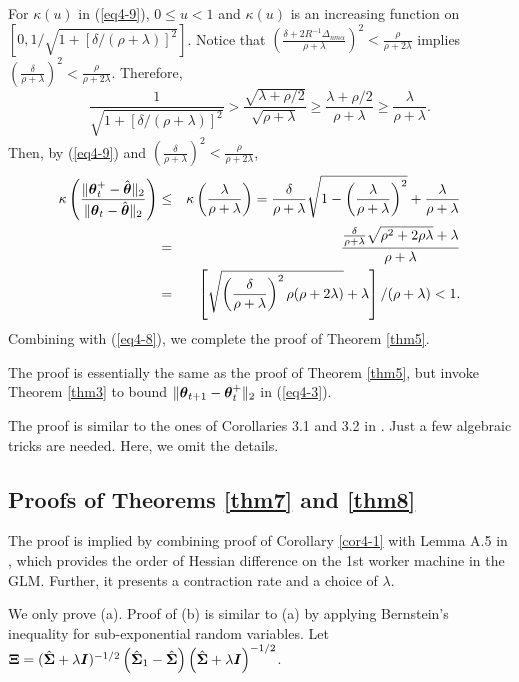 \documentclass[12pt,a4paper]{article}%
\newcommand\bes{\begin{eqnarray}}
\newcommand\ees{\end{eqnarray}}
\newcommand \vc[1]{{\mbox{\boldmath${#1}$}}}
\newcommand \vtheta{\vc \theta}
\numberwithin{equation}{section}
\newcommand{\sbr}[1]{\left(#1\right)}        %
\newcommand{\mbr}[1]{\left[#1\right]}        %
\begin{document}
For $\kappa(u)$ in (\ref{eq4-9}), $0\leq u<1$ and $\kappa(u)$ is an increasing function on $[0, 1/\sqrt{1+[\delta/(\rho+\lambda)]^2}]$.
Notice that $\sbr{\frac{\delta+2R^{-1}\Delta_{nm\alpha}}{\rho+\lambda}}^2<\frac{\rho}{\rho+2\lambda}$ implies $\sbr{\frac{\delta}{\rho+\lambda}}^2<\frac{\rho}{\rho+2\lambda}$. Therefore,
$$\frac{1}{\sqrt{1+[\delta/(\rho+\lambda)]^2}}>\frac{\sqrt{\lambda+\rho/2}}{\sqrt{\rho+\lambda}}\geq \frac{\lambda+\rho/2}{\rho+\lambda}\geq \frac{\lambda}{\rho+\lambda}.$$
Then, by (\ref{eq4-9}) and $\sbr{\frac{\delta}{\rho+\lambda}}^2<\frac{\rho}{\rho+2\lambda}$,
\bes
\kappa\sbr{\frac{\|\vtheta_t^+-\hat{\vtheta}\|_2}{\|\vtheta_t-\hat{\vtheta}\|_2}}&\leq&\kappa\sbr{\frac{\lambda}{\rho+\lambda}}
=\frac{\delta}{\rho+\lambda}\sqrt{1-\sbr{\frac{\lambda}{\rho+\lambda}}^2}+\frac{\lambda}{\rho+\lambda}\nonumber\\
&=&\frac{\frac{\delta}{\rho+\lambda}\sqrt{\rho^2+2\rho\lambda}+\lambda}{\rho+\lambda}\nonumber\\
&=&\mbr{\sqrt{\sbr{\frac{\delta}{\rho+\lambda}}^2\rho(\rho+2\lambda)}+\lambda}/(\rho+\lambda)<1.\nonumber
\ees
Combining with (\ref{eq4-8}), we complete the proof of Theorem \ref{thm5}.

 The proof is essentially the same as the proof of Theorem \ref{thm5}, but invoke Theorem \ref{thm3} to bound $\|\vtheta_{t+1}-\vtheta_t^+\|_2$ in (\ref{eq4-3}).

 The proof is similar to the ones of Corollaries 3.1 and 3.2 in \cite{FanGuoWang2019}. Just a few algebraic tricks are needed. Here, we omit the details.

\subsection{Proofs of Theorems \ref{thm7} and \ref{thm8}}

 The proof is implied by combining proof of Corollary \ref{cor4-1} with Lemma A.5 in \cite{FanGuoWang2019}, which provides the order of Hessian difference on the 1st worker machine in the GLM. Further, it presents a contraction rate and a choice of $\lambda$.

 We only prove (a). Proof of (b) is similar to (a) by applying Bernstein's inequality for sub-exponential random variables. Let $\vc\Xi=(\hat{\vc\Sigma}+\lambda \vc I)^{-1/2}\sbr{\hat{\vc\Sigma}_1-\hat{\vc\Sigma}}\sbr{\hat{\vc\Sigma}+\lambda \vc I}^{-1/2}$.
\end{document}
